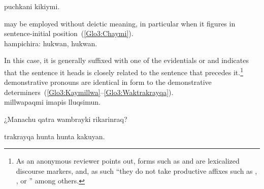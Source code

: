 %
{  puchkani kikiymi.}%
{}%
{}{}%

\noindent
{} may be employed without deictic meaning, in particular when it figures in sentence-initial position~(\ref{Glo3:Chaymi}).\\

%
{ hampichira: hukwan, hukwan.}%
{}%
{}{}%

\noindent
In this case, it is generally suffixed with one of the evidentials  or  and indicates that the sentence it heads is closely related to the sentence that precedes it.\footnote{As an anonymous reviewer points out, forms such as  and  are lexicalized discourse markers, and, as such “they do not take productive affixes such as , , or ” among others.} \SYQ{} demonstrative pronouns are identical in form to the demonstrative determiners~(\ref{Glo3:Kaymillwa}--\ref{Glo3:Waktrakrayqa}).\\

%
{ millwapaqmi imapis lluqsimun.}%
{}%
{}{}%

%
{¿Manachu  qatra wambrayki rikarinraq?}%
{}%
{}{}%

%
{ trakrayqa hunta hunta kakuyan.}%
{}%
{}{}%

